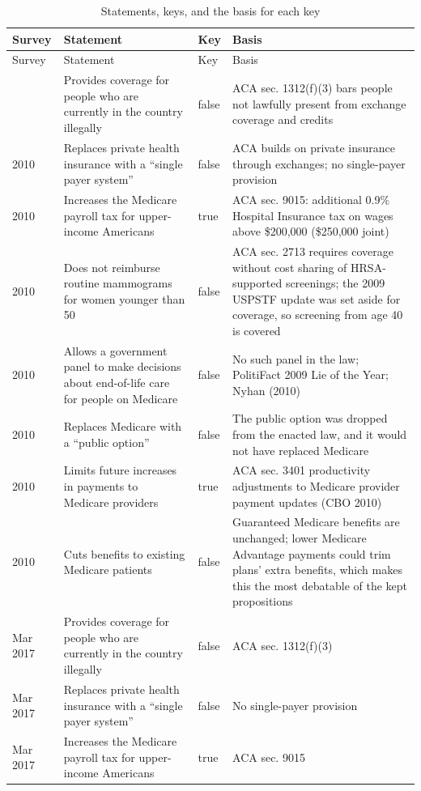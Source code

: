 \begin{longtable}{lp{4.8cm}lp{7cm}}
\caption{Statements, keys, and the basis for each key}\label{tab:propositions}\\
\toprule
Survey & Statement & Key & Basis \\
\midrule
\endfirsthead
\toprule
Survey & Statement & Key & Basis \\
\midrule
\endhead
\bottomrule
\endlastfoot
2010 & Provides coverage for people who are currently in the country illegally & false & ACA sec. 1312(f)(3) bars people not lawfully present from exchange coverage and credits \\
2010 & Replaces private health insurance with a ``single payer system'' & false & ACA builds on private insurance through exchanges; no single-payer provision \\
2010 & Increases the Medicare payroll tax for upper-income Americans & true & ACA sec. 9015: additional 0.9\% Hospital Insurance tax on wages above \$200,000 (\$250,000 joint) \\
2010 & Does not reimburse routine mammograms for women younger than 50 & false & ACA sec. 2713 requires coverage without cost sharing of HRSA-supported screenings; the 2009 USPSTF update was set aside for coverage, so screening from age 40 is covered \\
2010 & Allows a government panel to make decisions about end-of-life care for people on Medicare & false & No such panel in the law; PolitiFact 2009 Lie of the Year; Nyhan (2010) \\
2010 & Replaces Medicare with a ``public option'' & false & The public option was dropped from the enacted law, and it would not have replaced Medicare \\
2010 & Limits future increases in payments to Medicare providers & true & ACA sec. 3401 productivity adjustments to Medicare provider payment updates (CBO 2010) \\
2010 & Cuts benefits to existing Medicare patients & false & Guaranteed Medicare benefits are unchanged; lower Medicare Advantage payments could trim plans' extra benefits, which makes this the most debatable of the kept propositions \\
Mar 2017 & Provides coverage for people who are currently in the country illegally & false & ACA sec. 1312(f)(3) \\
Mar 2017 & Replaces private health insurance with a ``single payer system'' & false & No single-payer provision \\
Mar 2017 & Increases the Medicare payroll tax for upper-income Americans & true & ACA sec. 9015 \\

\end{longtable}
